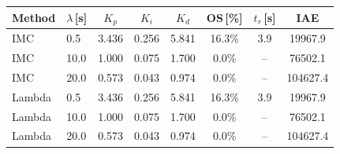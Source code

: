 \begin{tabular}{@{}llcccccc@{}}
\toprule
Method & $\lambda$\,[s] & $K_p$ & $K_i$ & $K_d$ & OS\,[\%] & $t_r$\,[s] & IAE \\
\midrule
IMC & 0.5 & 3.436 & 0.256 & 5.841 & 16.3\% & 3.9 & 19967.9 \\
IMC & 10.0 & 1.000 & 0.075 & 1.700 & 0.0\% & -- & 76502.1 \\
IMC & 20.0 & 0.573 & 0.043 & 0.974 & 0.0\% & -- & 104627.4 \\
Lambda & 0.5 & 3.436 & 0.256 & 5.841 & 16.3\% & 3.9 & 19967.9 \\
Lambda & 10.0 & 1.000 & 0.075 & 1.700 & 0.0\% & -- & 76502.1 \\
Lambda & 20.0 & 0.573 & 0.043 & 0.974 & 0.0\% & -- & 104627.4 \\
\bottomrule
\end{tabular}
